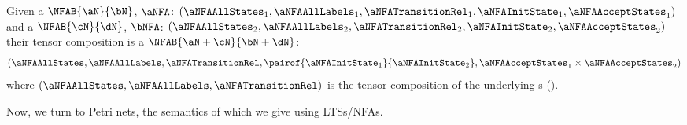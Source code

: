 \begin{definition}
\label{defn:tensorCompositionTNFA}
    Given a $\NFAB{\aN}{\bN}$, $\aNFA$:
    $( \aNFAAllStates_1
     , \aNFAAllLabels_1
     , \aNFATransitionRel_1
     , \aNFAInitState_1
     , \aNFAAcceptStates_1
     )$ and a $\NFAB{\cN}{\dN}$, $\bNFA$:
    $( \aNFAAllStates_2
     , \aNFAAllLabels_2
     , \aNFATransitionRel_2
     , \aNFAInitState_2
     , \aNFAAcceptStates_2
     )$ their tensor composition is a $\NFAB{\aN + \cN}{\bN + \dN}$:
    \[
        ( \aNFAAllStates
        , \aNFAAllLabels
        , \aNFATransitionRel
        , \pairof{\aNFAInitState_1}{\aNFAInitState_2}
        , \aNFAAcceptStates_1 \times \aNFAAcceptStates_2
        )
 \] where
    $( \aNFAAllStates
     , \aNFAAllLabels
     , \aNFATransitionRel)$ is the tensor composition of the underlying
     \TLTS{}s ().
\end{definition}

Now, we turn to Petri nets, the semantics of which we give using LTSs/NFAs.
